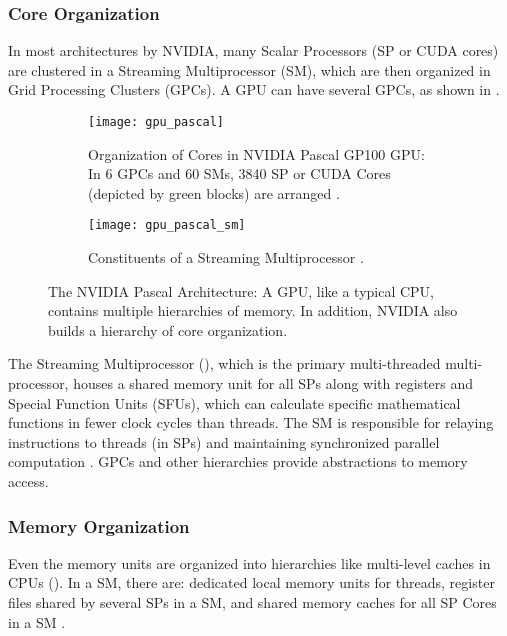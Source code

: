 \subsubsection{Core Organization}
In most architectures by NVIDIA, many Scalar Processors (SP or CUDA cores) are clustered in a Streaming Multiprocessor (SM), which are then organized in Grid Processing Clusters (GPCs). A GPU can have several GPCs, as shown in  \cite{CUDADocs,ParallelNVIDIA,wong2010demystifying}.
\begin{figure}
    \centering
    \begin{subfigure}{\textwidth}
        \centering
        \texttt{[image: gpu\_pascal]}
        \caption[Organization of Cores in NVIDIA Pascal GP100 GPU]{Organization of Cores in NVIDIA Pascal GP100 GPU: In 6 GPCs and 60 SMs, 3840 SP or CUDA Cores (depicted by green blocks) are arranged \cite{ParallelNVIDIA,PascalWhitepaper}.}
        \label{fig:Organization of Cores in NVIDIA Pascal GP100 GPU}
    \end{subfigure}\vspace*{1em}
    \begin{subfigure}{\textwidth}
        \centering
        \texttt{[image: gpu\_pascal\_sm]}
        \caption[Constituents of a Streaming Multiprocessor]{Constituents of a Streaming Multiprocessor \cite{ParallelNVIDIA,PascalWhitepaper}.}
        \label{fig:Constituents of a Streaming Multiprocessor}
    \end{subfigure}
    \caption[The NVIDIA Pascal Architecture]{The NVIDIA Pascal Architecture: A GPU, like a typical CPU, contains multiple hierarchies of memory. In addition, NVIDIA also builds a hierarchy of core organization.}
    \label{fig:The NVIDIA Pascal Architecture}
\end{figure}

The Streaming Multiprocessor (), which is the primary multi-threaded multi-processor, houses a shared memory unit for all SPs along with registers and Special Function Units (SFUs), which can calculate specific mathematical functions in fewer clock cycles than threads. The SM is responsible for relaying instructions to threads (in SPs) and maintaining synchronized parallel computation \cite{wong2010demystifying,PascalWhitepaper}. GPCs and other hierarchies provide abstractions to memory access.

\subsubsection{Memory Organization}
Even the memory units are organized into hierarchies like multi-level caches in CPUs (). In a SM, there are: dedicated local memory units for threads, register files shared by several SPs in a SM, and shared memory caches for all SP Cores in a SM \cite{PascalWhitepaper,ParallelNVIDIA}.


